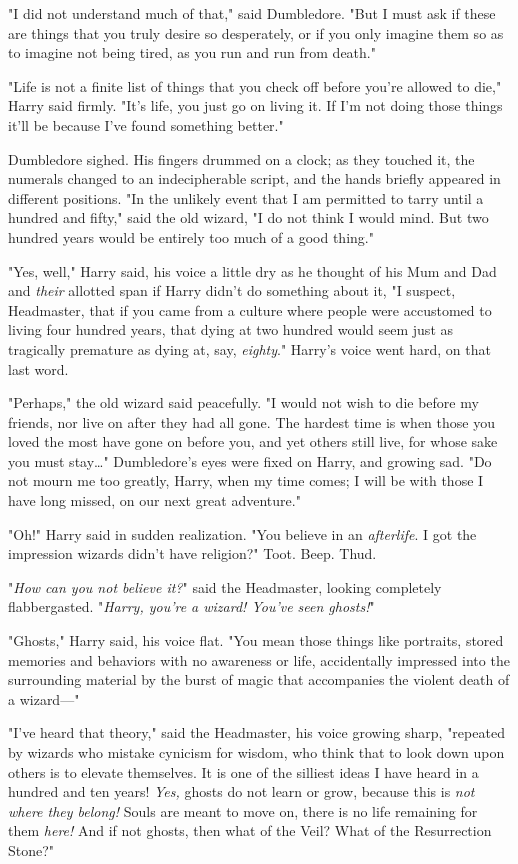 "I did not understand much of that," said Dumbledore. "But I must ask if these
are things that you truly desire so desperately, or if you only imagine them so
as to imagine not being tired, as you run and run from death."

"Life is not a finite list of things that you check off before you’re allowed
to die," Harry said firmly. "It’s life, you just go on living it. If I’m not
doing those things it’ll be because I’ve found something better."

Dumbledore sighed. His fingers drummed on a clock; as they touched it, the
numerals changed to an indecipherable script, and the hands briefly appeared in
different positions. "In the unlikely event that I am permitted to tarry until
a hundred and fifty," said the old wizard, "I do not think I would mind. But
two hundred years would be entirely too much of a good thing."

"Yes, well," Harry said, his voice a little dry as he thought of his Mum and
Dad and \emph{their} allotted span if Harry didn’t do something about it, "I
suspect, Headmaster, that if you came from a culture where people were
accustomed to living four hundred years, that dying at two hundred would seem
just as tragically premature as dying at, say, \emph{eighty}." Harry’s voice
went hard, on that last word.

"Perhaps," the old wizard said peacefully. "I would not wish to die before my
friends, nor live on after they had all gone. The hardest time is when those
you loved the most have gone on before you, and yet others still live, for
whose sake you must stay…" Dumbledore’s eyes were fixed on Harry, and
growing sad. "Do not mourn me too greatly, Harry, when my time comes; I will be
with those I have long missed, on our next great adventure."

"Oh!" Harry said in sudden realization. "You believe in an \emph{afterlife}. I
got the impression wizards didn’t have religion?"
\later
Toot. Beep. Thud.

"\emph{How can you not believe it?}" said the Headmaster, looking completely
flabbergasted. "\emph{Harry, you’re a wizard! You’ve seen ghosts!}"

"Ghosts," Harry said, his voice flat. "You mean those things like portraits,
stored memories and behaviors with no awareness or life, accidentally impressed
into the surrounding material by the burst of magic that accompanies the
violent death of a wizard—"

"I’ve heard that theory," said the Headmaster, his voice growing sharp,
"repeated by wizards who mistake cynicism for wisdom, who think that to look
down upon others is to elevate themselves. It is one of the silliest ideas I
have heard in a hundred and ten years! \emph{Yes,} ghosts do not learn or grow,
because this is \emph{not where they belong!} Souls are meant to move on, there
is no life remaining for them \emph{here!} And if not ghosts, then what of the
Veil? What of the Resurrection Stone?"

